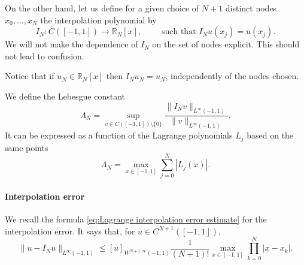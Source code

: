 On the other hand, let us define for a given choice of $N+1$ distinct nodes $x_0, \dots, x_{N}$ the interpolation polynomial by
\begin{equation*}
    I_N : C([-1,1]) \to \mathbb R_N[x], \qquad \text{ such that } I_N u(x_j) = u(x_j).
\end{equation*}
We will not make the dependence of $I_N$ on the set of nodes explicit. This should not lead to confusion.
\begin{remark}
    Notice that if $u_N \in \mathbb R_N[x]$ then $I_N u_N = u_N$, independently of the nodes chosen.
\end{remark}
We define the Lebesgue constant
\begin{equation*}
    \Lambda_N = \sup_{v \in C([-1,1]) \setminus \{0\}} \frac{\| I_N v \|_{L^\infty(-1,1)}}{\| v \|_{L^\infty(-1,1)}}.
\end{equation*}
It can be expressed as a function of the Lagrange polynomials $L_j$ based on the same points
\begin{equation*}
    \Lambda_N = \max_{x \in [-1,1]} \sum_{j=0}^N |L_j(x)|.
\end{equation*}

\paragraph{Interpolation error}
We recall the formula \eqref{eq:Lagrange interpolation error estimate} for the interpolation error. It says that, for $u \in C^{N+1}([-1,1])$,
\begin{equation*}
    \| u - I_N u \|_{L^\infty(-1,1)} \le [u]_{W^{N+1,\infty}(-1,1)} \frac 1 {(N+1)!} \max_{x \in [-1,1]} \prod_{k=0}^N |x-x_k|.
\end{equation*}

